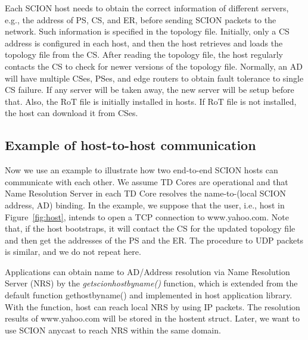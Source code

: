 
Each SCION host needs to obtain the correct information of different
servers, e.g., the address of PS, CS, and ER, before sending SCION
packets to the network. Such information is specified in the
topology file. Initially, only a CS address is configured in each
host, and then the host retrieves and loads the topology file from
the CS. After reading the topology file, the host regularly contacts
the CS to check for newer versions of the topology file. Normally,
an AD will have multiple CSes, PSes, and edge routers to obtain
fault tolerance to single CS failure. If any server will be taken
away, the new server will be setup before that.
Also, the RoT file is initially installed in hosts. If
RoT file is not installed, the host can download it from CSes.


\subsection{Example of host-to-host communication}

Now we use an example to illustrate how two end-to-end SCION hosts
can communicate with each other. We assume TD Cores are operational
and that Name Resolution Server in each TD Core resolves the
name-to-(local SCION address, AD) binding. In the example, we
suppose that the user, i.e., host in Figure~\ref{fig:host}, intends
to open a TCP connection to www.yahoo.com. Note that, if the host
bootstraps, it will contact the CS for the updated topology file and
then get the addresses of the PS and the ER. The procedure to  UDP
packets is similar, and we do not repeat here.

Applications can obtain name to AD/Address resolution via Name
Resolution Server (NRS) by the {\em getscionhostbyname()} function,
which is extended from the default function gethostbyname() and
implemented in host application library. With the function, host can
reach local NRS by using IP packets. The resolution results of
www.yahoo.com will be stored in the hostent struct. Later, we want
to use SCION anycast to reach NRS within the same domain.

